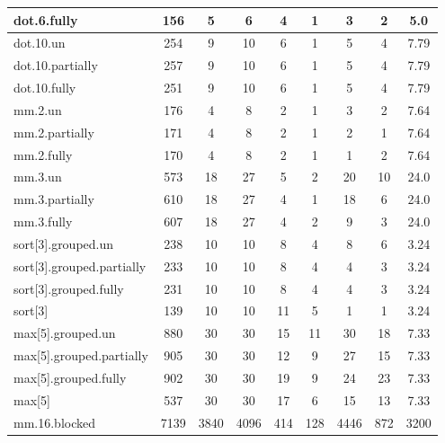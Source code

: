 \begin{table}
\begin{tabular}{lcccccccc}
    dot.6.fully & 156 & 5 & 6 & 4 & 1 & 3 & 2 & 5.0\\
    \midrule
    dot.10.un & 254 & 9 & 10 & 6 & 1 & 5 & 4 & 7.79\\
    dot.10.partially & 257 & 9 & 10 & 6 & 1 & 5 & 4 & 7.79\\
    dot.10.fully & 251 & 9 & 10 & 6 & 1 & 5 & 4 & 7.79\\
    \midrule
    mm.2.un & 176 & 4 & 8 & 2 & 1 & 3 & 2 & 7.64\\
    mm.2.partially & 171 & 4 & 8 & 2 & 1 & 2 & 1 & 7.64\\
    mm.2.fully & 170 & 4 & 8 & 2 & 1 & 1 & 2 & 7.64\\
    \midrule
    mm.3.un & 573 & 18 & 27 & 5 & 2 & 20 & 10 & 24.0\\
    mm.3.partially & 610 & 18 & 27 & 4 & 1 & 18 & 6 & 24.0\\
    mm.3.fully & 607 & 18 & 27 & 4 & 2 & 9 & 3 & 24.0\\
    \midrule
    sort[3].grouped.un & 238 & 10 & 10 & 8 & 4 & 8 & 6 & 3.24\\
    sort[3].grouped.partially & 233 & 10 & 10 & 8 & 4 & 4 & 3 & 3.24\\
    sort[3].grouped.fully & 231 & 10 & 10 & 8 & 4 & 4 & 3 & 3.24\\
    sort[3] & 139 & 10 & 10 & 11 & 5 & 1 & 1 & 3.24\\
    \midrule
    max[5].grouped.un & 880 & 30 & 30 & 15 & 11 & 30 & 18 & 7.33\\
    max[5].grouped.partially & 905 & 30 & 30 & 12 & 9 & 27 & 15 & 7.33\\
    max[5].grouped.fully & 902 & 30 & 30 & 19 & 9 & 24 & 23 & 7.33\\
    max[5] & 537 & 30 & 30 & 17 & 6 & 15 & 13 & 7.33\\
    \midrule
    mm.16.blocked & 7139 & 3840 & 4096 & 414 & 128 & 4446 & 872 & 3200\\
    \bottomrule
    \end{tabular}
\end{table}


